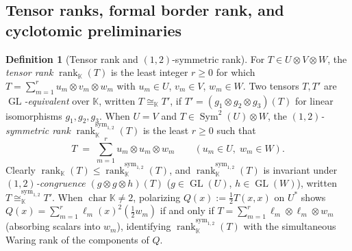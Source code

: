 \documentclass[11pt,reqno]{amsart}
\theoremstyle{definition}
\newtheorem{definition}[theorem]{Definition}
\theoremstyle{remark}
\numberwithin{equation}{section}
\newcommand{\KK}{\mathbb{K}}
\DeclareMathOperator{\rk}{rank}
\DeclareMathOperator{\Sym}{Sym}
\DeclareMathOperator{\GL}{GL}
\DeclareMathOperator{\chr}{char}
\begin{document}
\subsection{Tensor ranks, formal border rank, and cyclotomic preliminaries}

\begin{definition}[Tensor rank and $(1,2)$-symmetric rank]\label{def:ranks}
For $T \in U \otimes V \otimes W$, the \emph{tensor rank} $\rk_{\KK}(T)$ is the least integer $r \ge 0$ for which $T = \sum_{m=1}^r u_m \otimes v_m \otimes w_m$ with $u_m \in U$, $v_m \in V$, $w_m \in W$. Two tensors $T, T'$ are \emph{$\GL$-equivalent} over $\KK$, written $T \cong_{\KK} T'$, if $T' = (g_1 \otimes g_2 \otimes g_3)(T)$ for linear isomorphisms $g_1, g_2, g_3$. When $U = V$ and $T \in \Sym^2(U) \otimes W$, the \emph{$(1,2)$-symmetric rank} $\rk_{\KK}^{\mathrm{sym}_{1,2}}(T)$ is the least $r \ge 0$ such that
\begin{equation}\label{eq:sym12-def}
  T \;=\; \sum_{m=1}^r u_m \otimes u_m \otimes w_m \qquad (u_m \in U,\; w_m \in W).
\end{equation}
Clearly $\rk_{\KK}(T) \le \rk_{\KK}^{\mathrm{sym}_{1,2}}(T)$, and $\rk_{\KK}^{\mathrm{sym}_{1,2}}(T)$ is invariant under \emph{$(1,2)$-congruence} $(g \otimes g \otimes h)(T)$ ($g \in \GL(U)$, $h \in \GL(W)$), written $T \cong_{\KK}^{\mathrm{sym}_{1,2}} T'$. When $\chr\KK \neq 2$, polarizing $Q(x) := \frac{1}{2}T(x, x)$ on $U^*$ shows $Q(x) = \sum_{m=1}^r \ell_m(x)^2 (\frac{1}{2}w_m)$ if and only if $T = \sum_{m=1}^r \ell_m \otimes \ell_m \otimes w_m$ (absorbing scalars into $w_m$), identifying $\rk_{\KK}^{\mathrm{sym}_{1,2}}(T)$ with the simultaneous Waring rank of the components of $Q$.
\end{definition}
\end{document}
